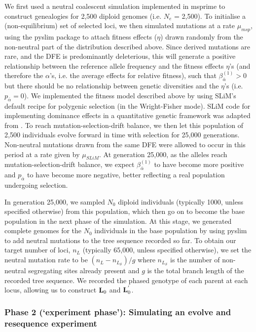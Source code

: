 \documentclass[12pt]{article}
\begin{document}
\begin{bibunit}
We first used a neutral coalescent simulation implemented in msprime \citep{kelleher2016efficient} to construct genealogies for 2,500 diploid genomes (i.e. $N_e$ = 2,500). To initialise a (non-equilibrium) set of selected loci, we then simulated mutations at a rate $\mu_{msp}$, using the pyslim package to attach fitness effects ($\eta$) drawn randomly from the non-neutral part of the distribution described above. Since derived mutations are rare, and the DFE is predominantly deleterious, this will generate a positive relationship between the reference allele frequency and the fitness effects $\eta$'s (and therefore the $\alpha$'s, i.e. the average effects for relative fitness), such that $\beta^{(1)}_{\bar \alpha} >0$ but there should be no relationship between genetic diversities and the $\eta$'s (i.e. $p_{\bar \alpha} = 0$). We implemented the fitness model described above by using SLiM's \citep{haller2023slim} default recipe for polygenic selection (in the Wright-Fisher mode). SLiM code for implementing dominance effects in a quantitative genetic framework was adapted from  \citet{schaal2022inversion}. To reach mutation-selection-drift balance,  we then let this population of 2,500 individuals evolve forward in time with selection for 25,000 generations. Non-neutral mutations drawn from the same DFE were allowed to occur in this period at a rate given by $\mu_{SLiM}$.  At generation 25,000, as the alleles reach mutation-selection-drift balance, we expect $\beta^{(1)}_{\bar \alpha}$ to have become more positive and $p_{\bar \alpha}$ to have become more negative, better reflecting a real population undergoing selection. 

In generation 25,000, we sampled $N_0$ diploid individuals (typically 1000, unless specified otherwise) from this population, which then go on to become the base population in the next phase of the simulation. At this stage, we generated complete genomes for the $N_0$ individuals in the base population by using pyslim to add neutral mutations to the tree sequence recorded so far. To obtain our target number of loci, $n_L$ (typically 65,000, unless specified otherwise), we set the neutral mutation rate to be $(n_L-n_{L_\mathcal{S}})/g$ where $n_{L_\mathcal{S}}$ is the number of non-neutral segregating sites already present and $g$ is the total branch length of the recorded tree sequence. We recorded the phased genotype of each parent at each locus, allowing  us to construct ${\bf L}_0$ and ${\bf L}^{'}_0$. 

\subsubsection*{Phase 2 (`experiment phase'): Simulating an evolve and resequence experiment}


\end{bibunit}
\end{document}
